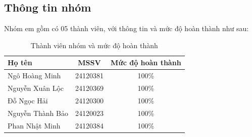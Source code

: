 \subsection{Thông tin nhóm}
Nhóm em gồm có 05 thành viên, với thông tin và mức độ hoàn thành như sau:
\begin{table}[h!]
    \centering
    \caption{Thành viên nhóm và mức độ hoàn thành}
    \label{tab:thong_tin_nhom}
    \begin{tabularx}{\textwidth}{Xcc}
        \toprule
        \textbf{Họ tên} & \textbf{MSSV} & \textbf{Mức độ hoàn thành} \\
        \midrule
        Ngô Hoàng Minh & 24120381 & 100\% \\
        Nguyễn Xuân Lộc & 24120369 & 100\% \\
        Đỗ Ngọc Hải & 24120300 & 100\% \\
        Nguyễn Thành Bảo & 24120023 & 100\% \\
        Phan Nhật Minh & 24120384 & 100\% \\
        \bottomrule
    \end{tabularx}
\end{table}
